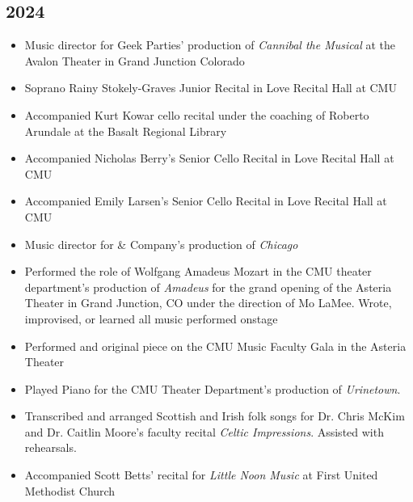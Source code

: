 \documentclass{article}
\newcommand{\cvItem}[1]{
        \item {
            {#1}
        }
    }
\newcommand{\cvItemListStart}{\begin{itemize}[leftmargin=10pt]}
\newcommand{\cvItemListEnd}{\end{itemize}}
\begin{document}
        \subsection{2024}
            \cvItemListStart
                \cvItem{Music director for Geek Parties' production of {\em Cannibal the Musical} at
                the Avalon Theater in Grand Junction Colorado}
                \cvItem{Soprano Rainy Stokely-Graves Junior Recital in Love Recital Hall at CMU}
                \cvItem{Accompanied Kurt Kowar cello recital under the coaching of Roberto Arundale
                at the Basalt Regional Library}
                \cvItem{Accompanied Nicholas Berry's Senior Cello Recital in Love Recital Hall at
                CMU}
                \cvItem{Accompanied Emily Larsen's Senior Cello Recital in Love Recital Hall at CMU}
                \cvItem{Music director for \& Company's production of {\em Chicago}}
                \cvItem{Performed the role of Wolfgang Amadeus Mozart in the CMU theater
                department's production of {\em Amadeus} for the grand opening of the Asteria
                Theater in Grand Junction, CO under the direction of Mo LaMee. Wrote, improvised, or
                learned all music performed onstage}
                \cvItem{Performed and original piece on the CMU Music Faculty Gala in the Asteria
                Theater}
                \cvItem{Played Piano for the CMU Theater Department's production of {\em
                Urinetown}.}
                \cvItem{Transcribed and arranged Scottish and Irish folk songs for Dr. Chris McKim and
                Dr. Caitlin Moore's faculty recital {\em Celtic Impressions}. Assisted with
                rehearsals.}
                \cvItem{Accompanied Scott Betts' recital for {\em Little Noon Music} at First United
                Methodist Church}
            \cvItemListEnd
\end{document}
